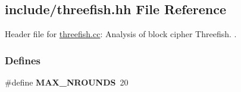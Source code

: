 \hypertarget{threefish_8hh}{\subsection{include/threefish.hh \-File \-Reference}
\label{threefish_8hh}
}


\-Header file for \hyperlink{threefish_8cc}{threefish.\-cc}\-: \-Analysis of block cipher \-Threefish. .  


\subsubsection*{\-Defines}
\begin{DoxyCompactItemize}
\item 
\hypertarget{threefish_8hh_ab9131406759404181baccde51c4fa855}{\#define {\bfseries \-M\-A\-X\-\_\-\-N\-R\-O\-U\-N\-D\-S}~20}\label{threefish_8hh_ab9131406759404181baccde51c4fa855}

\end{DoxyCompactItemize}
